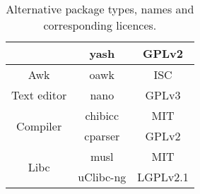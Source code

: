 \begin{table}[!h]
\begin{tabular}{|c|c|c|}
        \cline{2-3}
        & yash \cite{yash} & GPLv2 \\
        \hline
        Awk & oawk \cite{oawk} & ISC \\
        \hline
        Text editor & nano \cite{nano} & GPLv3 \\
        \hline
        \multirow{2}{*}{Compiler} & chibicc \cite{chibicc} & MIT \\
        \cline{2-3}
        & cparser \cite{cparser} & GPLv2 \\
        \hline
        \multirow{2}{*}{Libc} & musl \cite{musl} & MIT \\
        \cline{2-3}
        & uClibc-ng \cite{uclibc-ng} & LGPLv2.1 \\
        \hline
    \end{tabular}
    \caption{Alternative package types, names and corresponding licences.}
\end{table}
